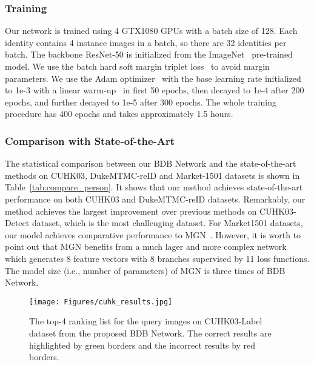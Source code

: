 \documentclass[10pt,twocolumn,letterpaper]{article}
\begin{document}
\subsubsection{Training}\vspace{-1mm}
Our network is trained using 4 GTX1080 GPUs with a batch size of 128. 
Each identity contains 4 instance images in a batch, so there are 32 identities per batch. 
The backbone ResNet-50 is initialized from the ImageNet~\cite{deng2009imagenet} pre-trained model. 
We use the batch hard soft margin triplet loss~\cite{hermans2017defense} to avoid margin parameters.
We use the Adam optimizer~\cite{kingma2014adame} with the base learning rate initialized to 1e-3 with a linear warm-up~\cite{goyal2017accurate} in first 50 epochs, then decayed to 1e-4 after 200 epochs, and further decayed to 1e-5 after 300 epochs. The whole training procedure has 400 epochs and takes approximately 1.5 hours. 
\vspace{-3mm}
\subsubsection{Comparison with State-of-the-Art}\vspace{-1mm}
The statistical comparison between our BDB Network and the state-of-the-art methods on CUHK03, DukeMTMC-reID and Market-1501 datasets is shown in Table~\ref{tab:compare_person}. It shows that our method achieves state-of-the-art performance on both CUHK03 and DukeMTMC-reID datasets. Remarkably, our method achieves the largest improvement over previous methods on CUHK03-Detect dataset, which is the most challenging dataset. For Market1501 datasets, our model achieves comparative performance to MGN~\cite{wang2018mgn}. However, it is worth to point out that MGN benefits from a much lager and more complex network which generates 8 feature vectors with 8 branches supervised by 11 loss functions. 
The model size (i.e., number of parameters) of MGN is three times of BDB Network.

\begin{figure}[t]
\begin{center}
\texttt{[image: Figures/cuhk\_results.jpg]}
\end{center}\vspace{-3mm}
\caption{The top-4 ranking list for the query images on CUHK03-Label dataset from the proposed BDB Network. 
The correct results are highlighted by green borders and the incorrect results by red borders.}
\label{fig:cuhk_results}
\vspace{3mm}
\end{figure}
\end{document}
